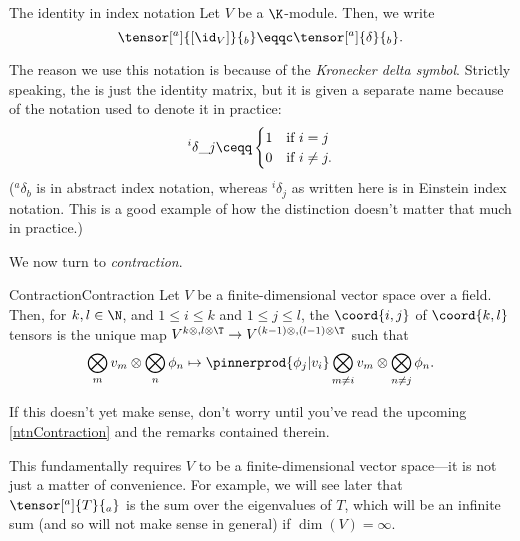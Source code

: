 \begin{ntn}{The identity in index notation}{}
	Let $V$ be a $\K$-module.  Then, we write
	\begin{equation}
		\tensor[^a]{[\id _V]}{_b}\eqqc \tensor[^a]{\delta}{_b}.
	\end{equation}
	\begin{rmk}
		The reason we use this notation is because of the \emph{Kronecker delta symbol}.  Strictly speaking, the  is just the identity matrix, but it is given a separate name because of the notation used to denote it in practice:
		\begin{equation}
			^i\delta \_j\ceqq \begin{cases}1 & \text{if }i=j \\ 0 & \text{if }i\neq j.\end{cases}
		\end{equation}
		($^a\delta _b$ is in abstract index notation, whereas $^i\delta _j$ as written here is in Einstein index notation.  This is a good example of how the distinction doesn't matter that much in practice.)
	\end{rmk}
\end{ntn}
We now turn to \emph{contraction}.
\begin{dfn}{Contraction}{Contraction}
	Let $V$ be a finite-dimensional vector space over a field.  Then, for $k,l\in \N$, and $1\leq i\leq k$ and $1\leq j\leq l$, the $\coord{i,j}$  of $\coord{k,l}$ tensors is the unique map $V^{k\otimes ,l\otimes \T}\rightarrow V^{(k-1)\otimes ,(l-1)\otimes \T}$ such that
	\begin{equation}
		\bigotimes _mv_m\otimes \bigotimes _{n}\phi _n\mapsto \pinnerprod{\phi _j|v_i}\bigotimes _{m\neq i}v_m\otimes \bigotimes _{n\neq j}\phi _n.
	\end{equation}
	\begin{rmk}
		If this doesn't yet make sense, don't worry until you've read the upcoming \cref{ntnContraction} and the remarks contained therein.
	\end{rmk}
	\begin{rmk}
		This fundamentally requires $V$ to be a finite-dimensional vector space---it is not just a matter of convenience.  For example, we will see later that $\tensor[^a]{T}{_a}$ is the sum over the eigenvalues of $T$, which will be an infinite sum (and so will not make sense in general) if $\dim (V)=\infty$.
	\end{rmk}
\end{dfn}
